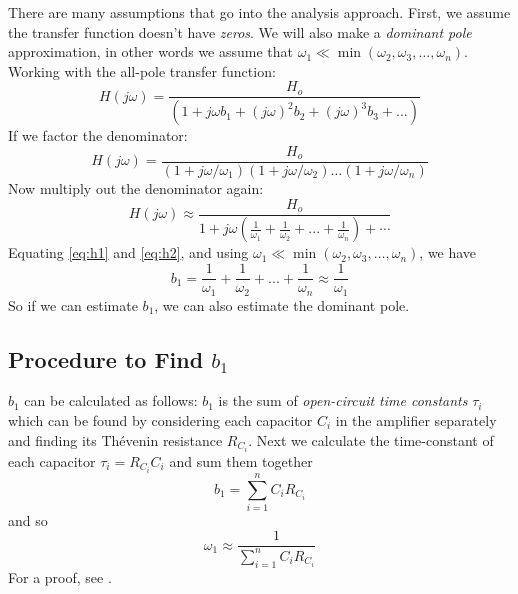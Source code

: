 There are many assumptions that go into the analysis approach.  First, we assume the transfer function doesn't have \textit{zeros}.  We will also make a  \textit{dominant pole} approximation, in other words we assume that $\omega_1 \ll \min(\omega_2, \omega_3, \dots, \omega_n)$. Working with the all-pole transfer function:
% 
\begin{equation}
	H(j\omega ) = \frac{{{H_o}}}{{\left( {1 + j\omega {b_1} + {{(j\omega )}^2}{b_2} + {{(j\omega )}^3}{b_3} + ...} \right)}} 
	\label{eq:h1}
\end{equation}
%
If we factor the denominator:
% 
\begin{equation}
	H(j\omega ) = \frac{{{H_o}}}{{\left( {1 + j\omega /{\omega _1}} \right)\left( {1 + j\omega /{\omega _2}} \right)...\left( {1 + j\omega /{\omega _n}} \right)}}
\end{equation}
%
Now multiply out the denominator again:
%
\begin{equation}  
	H(j\omega ) \approx \frac{{{H_o}}}{{1 + j\omega \left( {\frac{1}{{{\omega _1}}} + \frac{1}{{{\omega _2}}} + ... + \frac{1}{{{\omega _n}}}} \right) + \cdots }}
\label{eq:h2}
\end{equation}
%
Equating \ref{eq:h1} and \ref{eq:h2}, and using $\omega_1 \ll \min(\omega_2, \omega_3, \dots, \omega_n)$, we have
% 
\begin{equation} 
	{b_1} = \frac{1}{{{\omega _1}}} + \frac{1}{{{\omega _2}}} + ... + \frac{1}{{{\omega _n}}} \approx \frac{1}{{{\omega _1}}}
\end{equation}
%
So if we can estimate $b_1$, we can also estimate the dominant pole.

\subsection{Procedure to Find $b_1$}

$b_1$ can be calculated as follows:  $b_1$ is the sum of \textit{open-circuit time constants} $\tau_i$ which can be found by considering each capacitor $C_i$ in the amplifier separately and finding its Thévenin resistance $R_{C_i}$.  Next we calculate the time-constant of each capacitor $\tau_i = R_{C_i} C_i$ and sum them together
%
\begin{equation}
	b_1 = \sum_{i=1}^n C_i R_{C_i} 
\end{equation}
%
and so
%
\begin{equation}
 	\omega_1 \approx \frac{1}{  \sum_{i=1}^n C_i R_{C_i}  }
\end{equation}
For a proof, see \cite{GrayMeyer}. %
 





